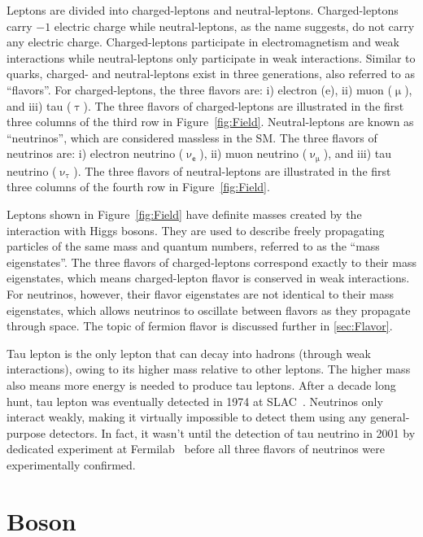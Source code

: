 Leptons are divided into charged-leptons and neutral-leptons. Charged-leptons carry $-1$ electric charge while neutral-leptons, as the name suggests, do not carry any electric charge. Charged-leptons participate in electromagnetism and weak interactions while neutral-leptons only participate in weak interactions. Similar to quarks, charged- and neutral-leptons exist in three generations, also referred to as ``flavors''. For charged-leptons, the three flavors are: i) electron (e), ii) muon ($\upmu$), and iii) tau ($\uptau$). The three flavors of charged-leptons are illustrated in the first three columns of the third row in Figure~\ref{fig:Field}. Neutral-leptons are known as ``neutrinos'', which are considered massless in the \ac{SM}. The three flavors of neutrinos are: i) electron neutrino ($\upnu_{\textsf{e}}$), ii) muon neutrino ($\upnu_{\upmu}$), and iii) tau neutrino ($\upnu_{\uptau}$). The three flavors of neutral-leptons are illustrated in the first three columns of the fourth row in Figure~\ref{fig:Field}.

Leptons shown in Figure~\ref{fig:Field} have definite masses created by the interaction with Higgs bosons. They are used to describe freely propagating particles of the same mass and quantum numbers, referred to as the ``mass eigenstates''. The three flavors of charged-leptons correspond exactly to their mass eigenstates, which means charged-lepton flavor is conserved in weak interactions. For neutrinos, however, their flavor eigenstates are not identical to their mass eigenstates, which allows neutrinos to oscillate between flavors as they propagate through space. The topic of fermion flavor is discussed further in \autoref{sec:Flavor}. 

Tau lepton is the only lepton that can decay into hadrons (through weak interactions), owing to its higher mass relative to other leptons. The higher mass also means more energy is needed to produce tau leptons. After a decade long hunt, tau lepton was eventually detected in 1974 at SLAC~\cite{Perl:1975bf}. Neutrinos only interact weakly, making it virtually impossible to detect them using any general-purpose detectors. In fact, it wasn't until the detection of tau neutrino in 2001 by dedicated experiment at Fermilab~\cite{DONUT:2000fbd} before all three flavors of neutrinos were experimentally confirmed. 

\section{Boson}
\label{sec:Boson}

